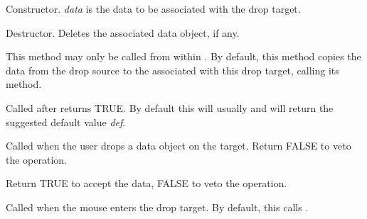 
Constructor. {\it data} is the data to be associated with the drop target.

\label{wxdroptargetdtor}


Destructor. Deletes the associated data object, if any.

\label{wxdroptargetgetdata}


This method may only be called from within .
By default, this method copies the data from the drop source to the 
 associated with this drop target,
calling its  method.

\label{wxdroptargetondata}


Called after  returns TRUE. By default this
will usually  and will return the suggested
default value {\it def}.

\label{wxdroptargetondrop}


Called when the user drops a data object on the target. Return FALSE to veto the operation.





Return TRUE to accept the data, FALSE to veto the operation.

\label{wxdroptargetonenter}


Called when the mouse enters the drop target. By default, this calls .

